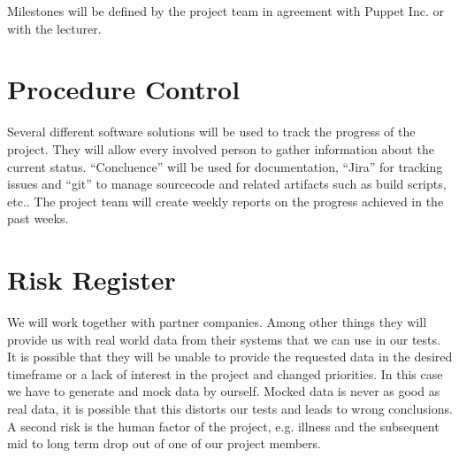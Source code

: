 Milestones will be defined by the project team in agreement with Puppet Inc. or
with the lecturer.

\section{Procedure Control}

Several different software solutions will be used to track the progress of the
project. They will allow every involved person to gather information about the
current status. ``Concluence'' will be used for documentation, ``Jira'' for tracking
issues and ``git'' to manage sourcecode and related artifacts such as build
scripts, etc.. The project team will create weekly reports on the progress
achieved in the past weeks.

\section{Risk Register}

We will work together with partner companies. Among other things they will
provide us with real world data from their systems that we can use in our tests.
It is possible that they will be unable to provide the requested data in the
desired timeframe or a lack of interest in the project and changed priorities.
In this case we have to generate and mock data by ourself. Mocked data is never
as good as real data, it is possible that this distorts our tests and leads to
wrong conclusions. A second risk is the human factor of the project, e.g.
illness and the subsequent mid to long term drop out of one of our project
members.

